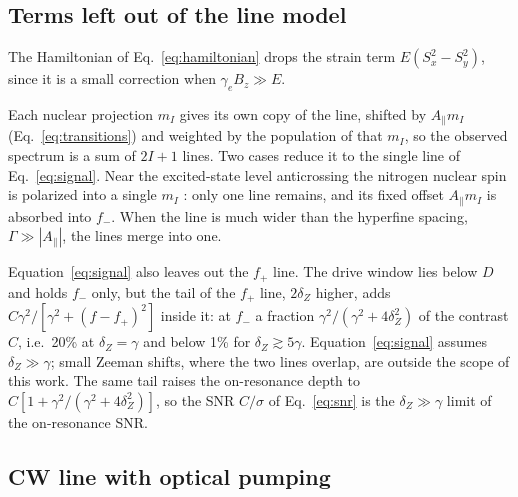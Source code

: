 
\subsection{Terms left out of the line model}

The Hamiltonian of Eq.~\eqref{eq:hamiltonian} drops the strain term $E(S_x^2-S_y^2)$, since it is a small correction
when $\gamma_e B_z\gg E$.

Each nuclear projection $m_I$ gives its own copy of the line, shifted by
$A_\parallel m_I$ (Eq.~\eqref{eq:transitions}) and weighted by the population of that $m_I$, so the observed
spectrum is a sum of $2I+1$ lines. Two cases reduce it to the single line of Eq.~\eqref{eq:signal}. Near the
excited-state level anticrossing the nitrogen nuclear spin is polarized into a single $m_I$ \cite{jacques2009}: only
one line remains, and its fixed offset $A_\parallel m_I$ is absorbed into $f_-$. When the line is much wider than
the hyperfine spacing, $\Gamma\gg|A_\parallel|$, the lines merge into one.

Equation~\eqref{eq:signal} also leaves out the $f_+$ line. The drive window lies below $D$ and holds $f_-$ only, but
the tail of the $f_+$ line, $2\delta_Z$ higher, adds $C\gamma^2/[\gamma^2+(f-f_+)^2]$ inside it: at $f_-$ a fraction
$\gamma^2/(\gamma^2+4\delta_Z^2)$ of the contrast $C$, i.e.\ 20\% at $\delta_Z=\gamma$ and below 1\% for
$\delta_Z\gtrsim5\gamma$. Equation~\eqref{eq:signal} assumes $\delta_Z\gg\gamma$; small Zeeman shifts, where the two
lines overlap, are outside the scope of this work. The same tail raises the on-resonance depth to
$C[1+\gamma^2/(\gamma^2+4\delta_Z^2)]$, so the SNR $C/\sigma$ of Eq.~\eqref{eq:snr} is the $\delta_Z\gg\gamma$ limit
of the on-resonance SNR.

\subsection{CW line with optical pumping}
\label{sm:cw-pumping}


